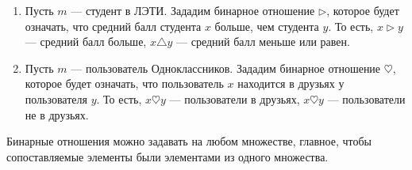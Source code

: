 \documentclass[russian]{lecture-notes}
\begin{document}
\begin{enumerate}
		\item Пусть $m$ --- студент в ЛЭТИ. Зададим бинарное отношение $\triangleright$, которое будет означать, что средний балл студента $x$ больше, чем студента $y$. То есть, $x \triangleright y$ --- средний балл больше, \sout{$x \triangle y$} --- средний балл меньше или равен.
		\item Пусть $m$ --- пользователь Одноклассников. Зададим бинарное отношение $\heartsuit$, которое будет означать, что пользователь $x$ находится в друзьях у пользователя $y$. То есть, $x \heartsuit y$ --- пользователи в друзьях, \sout{$x \heartsuit y$} --- пользователи не в друзьях.
	\end{enumerate}
	Бинарные отношения можно задавать на любом множестве, главное, чтобы сопоставляемые элементы были элементами из одного множества.
	
\end{document}
